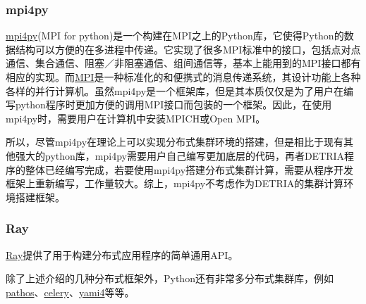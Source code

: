 \subsubsection{mpi4py}
\href{https://pypi.org/project/mpi4py/}{mpi4py}(MPI for python)是一个构建在MPI之上的Python库，它使得Python的数据结构可以方便的在多进程中传递。它实现了很多MPI标准中的接口，包括点对点通信、集合通信、阻塞／非阻塞通信、组间通信等，基本上能用到的MPI接口都有相应的实现。而\href{https://www.open-mpi.org/}{MPI}是一种标准化的和便携式的消息传递系统，其设计功能上各种各样的并行计算机。虽然mpi4py是一个框架库，但是其本质仅仅是为了用户在编写python程序时更加方便的调用MPI接口而包装的一个框架。因此，在使用mpi4py时，需要用户在计算机中安装MPICH或Open MPI。

所以，尽管mpi4py在理论上可以实现分布式集群环境的搭建，但是相比于现有其他强大的python库，mpi4py需要用户自己编写更加底层的代码，再者DETRIA程序的整体已经编写完成，若要使用mpi4py搭建分布式集群计算，需要从程序开发框架上重新编写，工作量较大。综上，mpi4py不考虑作为DETRIA的集群计算环境搭建框架。

\subsubsection{Ray}
\href{https://ray.io/}{Ray}提供了用于构建分布式应用程序的简单通用API。




除了上述介绍的几种分布式框架外，Python还有非常多分布式集群库，例如\href{https://pypi.org/project/pathos/}{pathos}、\href{https://pypi.org/project/celery/}{celery}、\href{http://www.inspirel.com/yami4/}{yami4}等等。